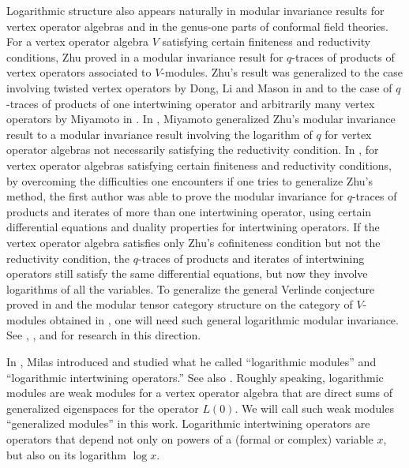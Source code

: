 \documentclass[12pt]{article}
\begin{document}
Logarithmic structure also appears naturally in modular invariance
results for vertex operator algebras and in the genus-one parts of
conformal field theories.  For a vertex operator algebra $V$
satisfying certain finiteness and reductivity conditions, Zhu proved
in \cite{Zhu} a modular invariance result for $q$-traces of products
of vertex operators associated to $V$-modules.  Zhu's result was
generalized to the case involving twisted vertex operators by Dong, Li
and Mason in \cite{DLM} and to the case of $q$-traces of products of
one intertwining operator and arbitrarily many vertex operators by
Miyamoto in \cite{M1}.  In \cite{M2}, Miyamoto generalized Zhu's
modular invariance result to a modular invariance result involving the
logarithm of $q$ for vertex operator algebras not necessarily
satisfying the reductivity condition.  In \cite{Hmodular}, for vertex
operator algebras satisfying certain finiteness and reductivity
conditions, by overcoming the difficulties one encounters if one tries
to generalize Zhu's method, the first author was able to prove the
modular invariance for $q$-traces of products and iterates of more
than one intertwining operator, using certain differential equations
and duality properties for intertwining operators.  If the vertex
operator algebra satisfies only Zhu's cofiniteness condition but not
the reductivity condition, the $q$-traces of products and iterates of
intertwining operators still satisfy the same differential equations,
but now they involve logarithms of all the variables.  To generalize
the general Verlinde conjecture proved in \cite{HVerlindeconjecture}
and the modular tensor category structure on the category of
$V$-modules obtained in \cite{rigidity}, one will need such general
logarithmic modular invariance.  See \cite{FHST}, \cite{Fu},
\cite{GR2} and \cite{GT} for research in this direction.

In \cite{Mi}, Milas introduced and studied what he called
``logarithmic modules'' and ``logarithmic intertwining operators.''
See also \cite{Mi2}.
Roughly speaking, logarithmic modules are weak modules for a vertex
operator algebra that are direct sums of generalized eigenspaces for
the operator $L(0)$.  We will call such weak modules ``generalized
modules'' in this work.  Logarithmic intertwining operators are
operators that depend not only on powers of a (formal or complex)
variable $x$, but also on its logarithm $\log x$.
\end{document}
